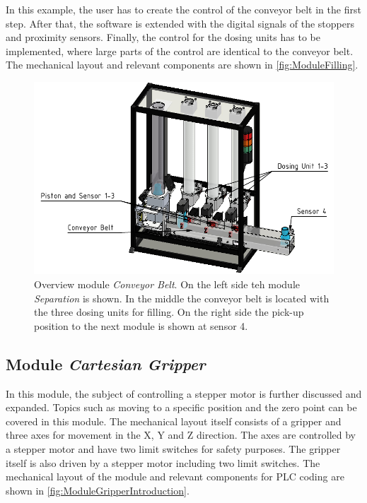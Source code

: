     In this example, the user has to create the control of the conveyor belt in the first step. After that, the software is extended with the digital signals of the stoppers and proximity sensors. Finally, the control for the dosing units has to be implemented, where large parts of the control are identical to the conveyor belt. The mechanical layout and relevant components  are shown in \autoref{fig:ModuleFilling}. 
	\begin{figure}[htp]
		\centering
	    \includegraphics{figures/CadConveyor.pdf}
		\caption[Overview module \textit{Conveyor Belt}.]{Overview module \textit{Conveyor Belt}. On the left side teh module \textit{Separation} is shown. In the middle the conveyor belt is located with the three dosing units for filling. On the right side the pick-up position to the next module is shown at sensor 4.}
		\label{fig:ModuleFilling}
	\end{figure}
    
    
	\subsection{Module \textit{Cartesian Gripper}}
	    In this module, the subject of controlling a stepper motor is further discussed and expanded. Topics such as moving to a specific position and the zero point can be covered in this module. The mechanical layout itself consists of a gripper and three axes for movement in the X, Y and Z direction. The axes are controlled by a stepper motor and have two limit switches for safety purposes. The gripper itself is also driven by a stepper motor including two limit switches. The mechanical layout of the module and relevant components for PLC coding are shown in \autoref{fig:ModuleGripperIntroduction}.\\
	    
